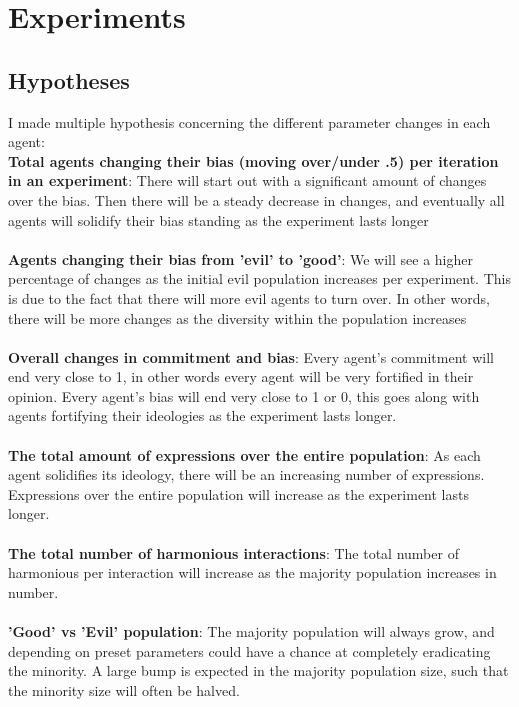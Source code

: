 \documentclass[]{article}
\begin{document}
\section{Experiments}
\subsection{Hypotheses}
I made multiple hypothesis concerning the different parameter changes in each agent: \\
\textbf{Total agents changing their bias (moving over/under .5) per iteration in an experiment}: There will start out with a significant amount of changes over the bias. Then there will be a steady decrease in changes, and eventually all agents will solidify their bias standing as the experiment lasts longer
\\
\\
\textbf{Agents changing their bias from 'evil' to 'good'}: We will see a higher percentage of changes as the initial evil population increases per experiment. This is due to the fact that there will more evil agents to turn over. In other words, there will be more changes as the diversity within the population increases
\\
\\
\textbf{Overall changes in commitment and bias}: Every agent's commitment will end very close to 1, in other words every agent will be very fortified in their opinion. Every agent's bias will end very close to 1 or 0, this goes along with agents fortifying their ideologies as the experiment lasts longer. 
\\
\\
\textbf{The total amount of expressions over the entire population}: As each agent solidifies its ideology, there will be an increasing number of expressions. Expressions over the entire population will increase as the experiment lasts longer.
\\
\\
\textbf{The total number of harmonious interactions}: The total number of harmonious per interaction will increase as the majority population increases in number. 
\\
\\
\textbf{'Good' vs 'Evil' population}: The majority population will always grow, and depending on preset parameters could have a chance at completely eradicating the minority. A large bump is expected in the majority population size, such that the minority size will often be halved. 
\\
\\
\end{document}
